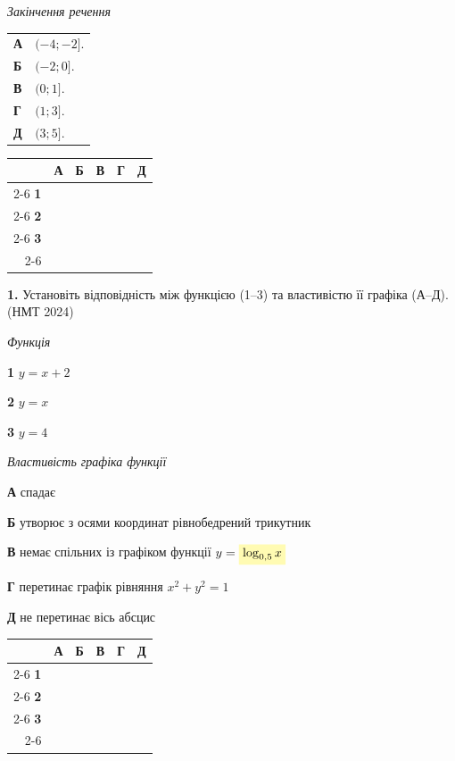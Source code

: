 \documentclass[14pt]{extarticle}
\newcommand{\answerGridSmall}{
    \begingroup
    \renewcommand{\arraystretch}{1.2} 
    \setlength{\tabcolsep}{5pt} 
    \begin{tabular}{r|c|c|c|c|c|}
         \multicolumn{1}{c}{} & \multicolumn{1}{c}{\textbf{А}} & \multicolumn{1}{c}{\textbf{Б}} & \multicolumn{1}{c}{\textbf{В}} & \multicolumn{1}{c}{\textbf{Г}} & \multicolumn{1}{c}{\textbf{Д}} \\ \cline{2-6}
         \textbf{1} & & & & & \\ \cline{2-6}
         \textbf{2} & & & & & \\ \cline{2-6}
         \textbf{3} & & & & & \\ \cline{2-6}
    \end{tabular}
    \endgroup
}
\newcommand{\matchingLayoutBottom}[2]{
    \noindent
    \begin{minipage}[t]{0.48\textwidth}
        #1
    \end{minipage}%
    \hfill
    \begin{minipage}[t]{0.48\textwidth}
        #2
    \end{minipage}
    
    \vspace{0.5cm}
    
    \noindent
    \answerGridSmall
}
\newcommand{\nmtyear}[1]{\hfill{\small\color{yearcolor}(НМТ #1)}}
\begin{document}
\vspace{0.2cm}

\noindent
\begin{minipage}[t]{0.55\textwidth}
    \textit{Закінчення речення} \par \vspace{0.2cm}
    \begin{tabular}{ll}
    \textbf{А} & $(-4; -2]$. \\
    \textbf{Б} & $(-2; 0]$. \\
    \textbf{В} & $(0; 1]$. \\
    \textbf{Г} & $(1; 3]$. \\
    \textbf{Д} & $(3; 5]$. \\
    \end{tabular}
\end{minipage}%
\hfill
\begin{minipage}[t]{0.40\textwidth}
    \vspace{0.5cm}
    \begin{flushright}
    \begingroup
    \setlength{\tabcolsep}{4pt}
    \renewcommand{\arraystretch}{1.2}
    \small
    \begin{tabular}{r|c|c|c|c|c|}
         \multicolumn{1}{c}{} & \multicolumn{1}{c}{\textbf{А}} & \multicolumn{1}{c}{\textbf{Б}} & \multicolumn{1}{c}{\textbf{В}} & \multicolumn{1}{c}{\textbf{Г}} & \multicolumn{1}{c}{\textbf{Д}} \\ \cline{2-6}
         \textbf{1} & & & & & \\ \cline{2-6}
         \textbf{2} & & & & & \\ \cline{2-6}
         \textbf{3} & & & & & \\ \cline{2-6}
    \end{tabular}
    \endgroup
    \end{flushright}
\end{minipage}



\noindent\textbf{1.} Установіть відповідність між функцією (1--3) та властивістю її графіка (А--Д). \nmtyear{2024}
\vspace{0.3cm}

\matchingLayoutBottom{\textit{Функція}

\textbf{1} \quad $y = x + 2$

\textbf{2} \quad $y = x$

\textbf{3} \quad $y = 4$
}{
\textit{Властивість графіка функції}

\textbf{А} \quad спадає

\textbf{Б} \quad утворює з осями координат рівнобедрений трикутник

\textbf{В} \quad немає спільних із графіком функції $y = \colorbox{yellow!30}{$\log_{0,5} x$}$

\textbf{Г} \quad перетинає графік рівняння $x^2 + y^2 = 1$

\textbf{Д} \quad не перетинає вісь абсцис
}
\end{document}
